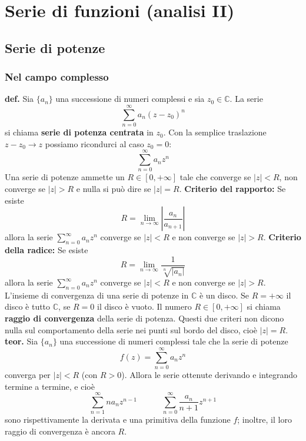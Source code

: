 \section{Serie di funzioni (analisi II)}
\subsection{Serie di potenze}
\subsubsection{Nel campo complesso}
\textbf{def.} Sia $\{a_n\}$ una successione di numeri complessi e sia $z_0 \in \mathbb{C}$.\newline
La serie
\[
    \sum_{n=0}^{\infty} a_n (z-z_0)^n
\]
si chiama \textbf{serie di potenza centrata} in $z_0$.\newline
\newline
Con la semplice traslazione $z-z_0 \rightarrow z$ possiamo ricondurci al caso $z_0 = 0$:
\[
    \sum_{n=0}^{\infty}a_n z^n
\]
\newline
Una serie di potenze ammette un $R \in [0, +\infty]$ tale che converge se $|z| < R$, non converge se $|z| > R$ e nulla si può dire se $|z| = R$.\newline
\newline
\textbf{Criterio del rapporto:} Se esiste
\[
    R = \lim_{n\rightarrow \infty}\left| \frac{a_n}{a_{n+1}}\right|
\]
allora la serie $\sum_{n=0}^{\infty}a_n z^n$ converge se $|z|< R$ e non converge se $|z|> R$.\newline
\newline
\textbf{Criterio della radice:} Se esiste
\[
    R = \lim_{n\rightarrow \infty} \frac{1}{\sqrt[n]{|a_n|}}
\]
allora la serie $\sum_{n=0}^{\infty}a_n z^n$ converge se $|z| < R$ e non converge se $|z|> R$.\newline
\newline
L'insieme di convergenza di una serie di potenze in $\mathbb{C}$ è un disco.\newline
Se $R = +\infty$ il disco è tutto $\mathbb{C}$, se $R = 0$ il disco è vuoto. Il numero $R \in [0, + \infty]$ si chiama \textbf{raggio di convergenza} della serie di potenza.\newline
\newline
Questi due criteri non dicono nulla sul comportamento della serie nei punti sul bordo del disco, cioè $|z| = R$.\newline
\newline
\textbf{teor.} Sia $\{a_n\}$ una successione di numeri complessi tale che la serie di potenze
\[
    f(z) = \sum_{n=0}^{\infty} a_n z^n
\]
converga per $|z|<R$ (con $R> 0$). Allora le serie ottenute derivando e integrando termine a termine, e cioè
\[
    \sum_{n=1}^{\infty} n a_n z^{n-1} \quad \quad \quad \sum_{n=0}^{\infty} \frac{a_n}{n+1} z^{n+1}
\]
sono rispettivamente la derivata e una primitiva della funzione $f$; inoltre, il loro raggio di convergenza è ancora $R$.\newline
